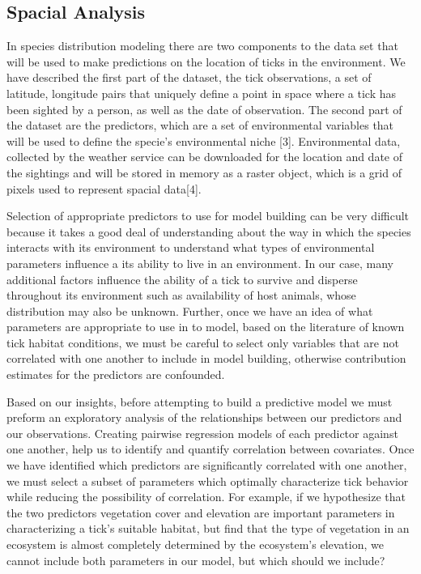 \subsection{Spacial Analysis}
In species distribution modeling there are two components to the data set that will be used to make predictions on the location of ticks in the environment. We have described the first part of the dataset, the tick observations, a set of latitude, longitude pairs that uniquely define a point in space where a tick has been sighted by a person, as well as the date of observation. The second part of the dataset are the predictors, which are a set of environmental variables that will be used to define the specie's environmental niche [3]. Environmental data, collected by the weather service can be downloaded for the location and date of the sightings and will be stored in memory as a raster object, which is a grid of pixels used to represent spacial data[4].  \newline

\noindent Selection of appropriate predictors to use for model building can be very difficult because it takes a good deal of understanding about the way in which the species interacts with its environment to understand what types of environmental parameters influence a its ability to live in an environment. In our case, many additional factors influence the ability of a tick to survive and disperse throughout its environment such as availability of host animals, whose distribution may also be unknown. Further, once we have an idea of what parameters are appropriate to use in to model, based on the literature of known tick habitat conditions, we must be careful to select only variables that are not correlated with one another to include in model building, otherwise contribution estimates for the predictors are confounded. \newline

\noindent Based on our insights, before attempting to build a predictive model we must preform an exploratory analysis of the relationships between our predictors and our observations. Creating pairwise regression models of each predictor against one another, help us to identify and quantify correlation between covariates. Once we have identified which predictors are significantly correlated with one another, we must select a subset of parameters which optimally characterize tick behavior while reducing the possibility of correlation. For example, if we hypothesize that the two predictors vegetation cover and elevation are important parameters in characterizing a tick's suitable habitat, but find that the type of vegetation in an ecosystem is almost completely determined by the ecosystem's elevation, we cannot include both parameters in our model, but which should we include? \newline

